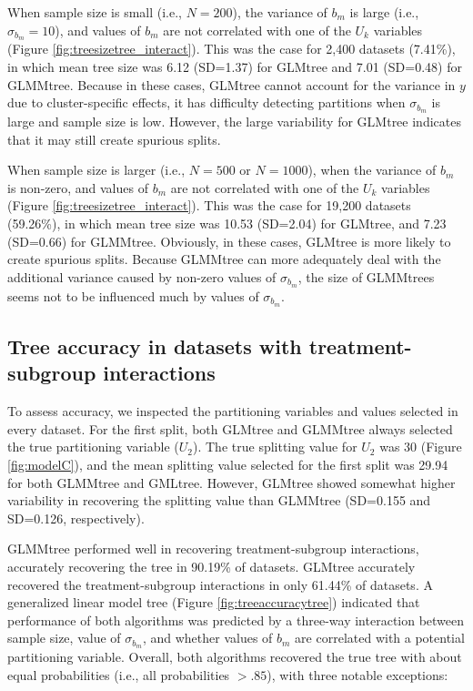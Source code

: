 \documentclass[nobf,doc]{apa}
\begin{document}
When sample size is small (i.e., $N=200$), the variance of $b_m$ is large (i.e., $\sigma_{b_m} = 10$), and values of $b_m$ are not correlated with one of the $U_k$ variables (Figure \ref{fig:treesizetree_interact}). This was the case for 2,400 datasets (7.41\%), in which mean tree size was 6.12 (SD=1.37) for GLMtree and 7.01 (SD=0.48) for GLMMtree. Because in these cases, GLMtree cannot account for the variance in $y$ due to cluster-specific effects, it has difficulty detecting partitions when $\sigma_{b_m}$ is large and sample size is low. However, the large variability for GLMtree indicates that it may still create spurious splits.

When sample size is larger (i.e., $N=500$ or $N=1000$), when the variance of $b_m$ is non-zero, and values of $b_m$ are not correlated with one of the $U_k$ variables (Figure \ref{fig:treesizetree_interact}). This was the case for 19,200 datasets (59.26\%), in which mean tree size was 10.53 (SD=2.04) for GLMtree, and 7.23 (SD=0.66) for GLMMtree. Obviously, in these cases, GLMtree is more likely to create spurious splits. Because GLMMtree can more adequately deal with the additional variance caused by non-zero values of $\sigma_{b_m}$, the size of GLMMtrees seems not to be influenced much by values of $\sigma_{b_m}$. 


	


 
\subsection{Tree accuracy in datasets with treatment-subgroup interactions}

To assess accuracy, we inspected the partitioning variables and values selected in every dataset. For the first split, both GLMtree and GLMMtree always selected the true partitioning variable ($U_2$). The true splitting value for $U_2$ was 30 (Figure \ref{fig:modelC}), and the mean splitting value selected for the first split was 29.94 for both GLMMtree and GMLtree. However, GLMtree showed somewhat higher variability in recovering the splitting value than GLMMtree (SD=0.155 and SD=0.126, respectively).

GLMMtree performed well in recovering treatment-subgroup interactions, accurately recovering the tree in 90.19\% of datasets. GLMtree accurately recovered the treatment-subgroup interactions in only 61.44\% of datasets. A generalized linear model tree (Figure \ref{fig:treeaccuracytree}) indicated that performance of both algorithms was predicted by a three-way interaction between sample size, value of $\sigma_{b_m}$, and whether values of $b_m$ are correlated with a potential partitioning variable. Overall, both algorithms recovered the true tree with about equal probabilities (i.e., all probabilities $>.85$), with three notable exceptions:
\end{document}
